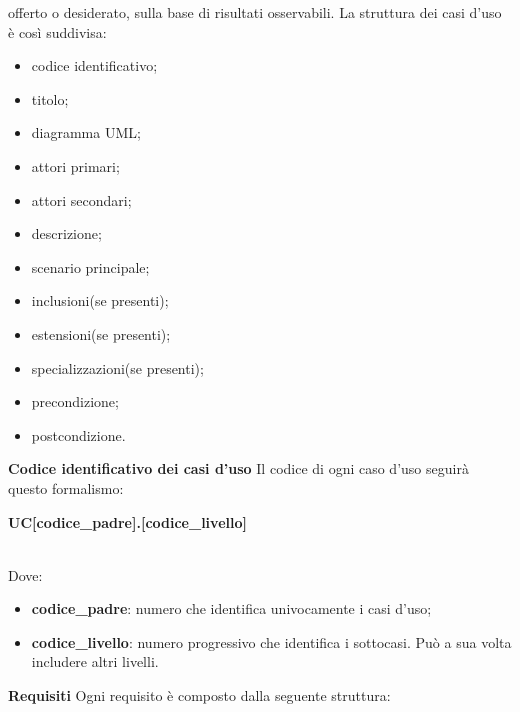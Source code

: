 			offerto o desiderato, sulla base di risultati osservabili.
			La struttura dei casi d'uso è così suddivisa:
			\begin{itemize}
				\item codice identificativo;
				\item titolo;
				\item diagramma UML\glo;
				\item attori primari;
				\item attori secondari;
				\item descrizione;
				\item scenario principale;
				\item inclusioni(se presenti);
				\item estensioni(se presenti);
				\item specializzazioni(se presenti);
				\item precondizione;
				\item postcondizione.
			\end{itemize}
			\textbf{Codice identificativo dei casi d'uso} \newline \newline
			Il codice di ogni caso d'uso seguirà questo formalismo: \newline \newline
			\centerline{\textbf{UC[codice\_padre].[codice\_livello]}} \\
			Dove:
			\begin{itemize}
				\item \textbf{codice\_padre}: numero che identifica univocamente i casi d'uso;
				\item \textbf{codice\_livello}: numero progressivo che identifica i sottocasi. Può a sua volta includere altri livelli.
			\end{itemize}
			\pagebreak
			\textbf{Requisiti} \newline \newline
			Ogni requisito è composto dalla seguente struttura:

